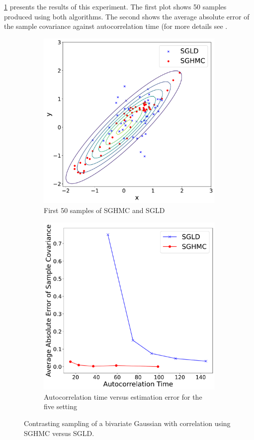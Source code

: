 \cref{fig:sghmc vs sgld} presents the results of this experiment. The first plot shows 50 samples produced using both algorithms. The second shows the average absolute error of the sample covariance against autocorrelation time (for more details see \cite{sghmc}.
\begin{figure}[h!]
  \begin{subfigure}{.5\textwidth}
  \includegraphics[width=.95\linewidth]{parts/Images/fig3b.pdf}
  \caption{First 50 samples of SGHMC and SGLD}
  \end{subfigure}
  \begin{subfigure}{.5\textwidth}
  \includegraphics[width=.95\linewidth]{parts/Images/fig3a.pdf}
  \caption{Autocorrelation time versus estimation error for the five setting}
  \end{subfigure}%
  \caption{Contrasting sampling of a bivariate Gaussian with correlation using SGHMC versus SGLD.}
  \label{fig:sghmc vs sgld}
\end{figure}

